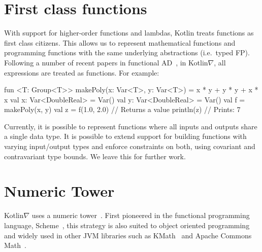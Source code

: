 \documentclass[12pt,initial,twoside,maitrise]{dms}
\numberwithin{equation}{section}
\numberwithin{table}{chapter}
\numberwithin{figure}{chapter}
\begin{document}
\section{First class functions}\label{sec:first-class-functions}

With support for higher-order functions and lambdas, Kotlin treats functions as first class citizens. This allows us to represent mathematical functions and programming functions with the same underlying abstractions (i.e.\ typed FP). Following a number of recent papers in functional AD~\citep{pearlmutter2008reverse,wang2018backpropagation}, in Kotlin$\nabla$, all expressions are treated as functions. For example:

\begin{kotlinlisting}
fun <T: Group<T>> makePoly(x: Var<T>, y: Var<T>) = x * y + y * y + x * x
val x: Var<DoubleReal> = Var()
val y: Var<DoubleReal> = Var()
val f = makePoly(x, y)
val z = f(1.0, 2.0) // Returns a value
println(z) // Prints: 7
\end{kotlinlisting}
%
Currently, it is possible to represent functions where all inputs and outputs share a single data type. It is possible to extend support for building functions with varying input/output types and enforce constraints on both, using covariant and contravariant type bounds. We leave this for further work.

\section{Numeric Tower}\label{sec:numeric-tower}

Kotlin$\nabla$ uses a numeric tower~\citep{st2012typing}. First pioneered in the functional programming language, Scheme~\citep{sperber2009revised}, this strategy is also suited to object oriented programming~\citep{niculescu2003design, niculescu2011using} and widely used in other JVM libraries such as KMath~\citep{nozik2019acat} and Apache Commons Math~\citep{developers2012apache}.
\end{document}
